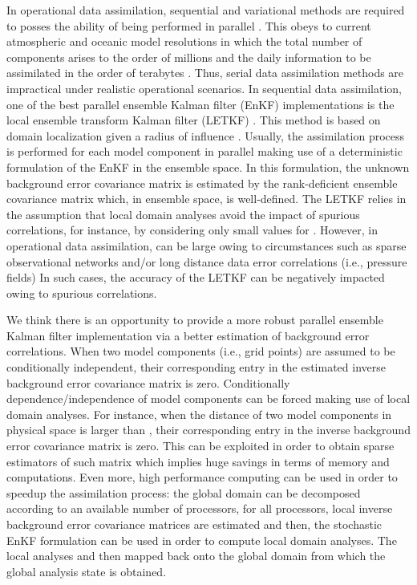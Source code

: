 \documentclass[12pt]{article}
\begin{document}
In operational data assimilation, sequential and variational methods are required to posses the ability of being performed in parallel \cite{nerger2013software,rao2016time,liu2012advancing}. This obeys to current atmospheric and oceanic model resolutions in which the total number of components arises to the order of millions and the daily information to be assimilated in the order of terabytes \cite{DAIssues,emerick2013ensemble}. Thus, serial data assimilation methods are impractical under realistic operational scenarios. In sequential data assimilation, one of the best parallel ensemble Kalman filter (EnKF) implementations is the local ensemble transform Kalman filter (LETKF) \cite{TELA:TELA076}. This method is based on domain localization given a radius of influence . Usually, the assimilation process is performed for each model component in parallel making use of a deterministic formulation of the EnKF in the ensemble space. In this formulation, the unknown background error covariance matrix is estimated by the rank-deficient ensemble covariance matrix which, in ensemble space, is well-defined. The LETKF relies in the assumption that local domain analyses avoid the impact of spurious correlations, for instance, by considering only small values for . However, in operational data assimilation,  can be large owing to circumstances such as sparse observational networks and/or long distance data error correlations (i.e., pressure fields) In such cases, the accuracy of the LETKF can be negatively impacted owing to spurious correlations. 

We think there is an opportunity to provide a more robust parallel ensemble Kalman filter implementation via a better estimation of background error correlations. When two model components (i.e., grid points) are assumed to be conditionally independent, their corresponding entry in the estimated inverse background error covariance matrix is zero. Conditionally dependence/independence of model components can be forced making use of local domain analyses. For instance, when the distance of two model components in physical space is larger than , their corresponding entry in the inverse background error covariance matrix is zero. This can be exploited in order to obtain sparse estimators of such matrix which implies huge savings in terms of memory and computations. Even more, high performance computing can be used in order to speedup the assimilation process: the global domain can be decomposed according to an available number of processors, for all processors, local inverse background error covariance matrices are estimated and then,  the stochastic EnKF formulation \cite{EnKFEvensen} can be used in order to compute local domain analyses. The local analyses and then mapped back onto the global domain from which the global analysis state is obtained.
\end{document}
